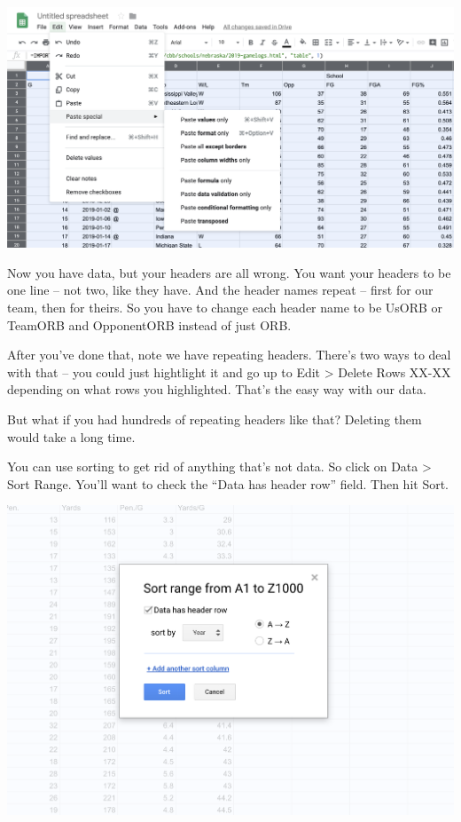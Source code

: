\documentclass[]{book}
\begin{document}
\includegraphics[width=36.81in]{images/clean2}

Now you have data, but your headers are all wrong. You want your headers to be one line -- not two, like they have. And the header names repeat -- first for our team, then for theirs. So you have to change each header name to be UsORB or TeamORB and OpponentORB instead of just ORB.

After you've done that, note we have repeating headers. There's two ways to deal with that -- you could just hightlight it and go up to Edit \textgreater{} Delete Rows XX-XX depending on what rows you highlighted. That's the easy way with our data.

But what if you had hundreds of repeating headers like that? Deleting them would take a long time.

You can use sorting to get rid of anything that's not data. So click on Data \textgreater{} Sort Range. You'll want to check the ``Data has header row'' field. Then hit Sort.

\includegraphics[width=21.61in]{images/clean3}
\end{document}
